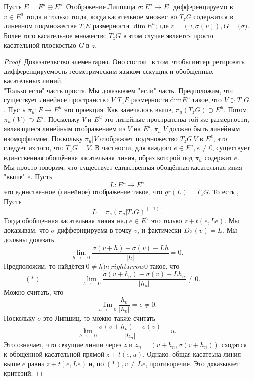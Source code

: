 \begin{criteria}
Пусть $E=E^u \oplus E^s$. Отображение Липшица $\sigma : E^u \rightarrow E^s$ дифференцируемо в $v \in E^u$ тогда и только тогда, когда касательное множество $T_zG$ содержится в линейном подмножестве $T_zE$ размерности $\dim E^u$; где $z=(v,\sigma(v)), G=\mathrm(\sigma)$. Более того касательное множество $T_zG$ в этом случае является просто касательной плоскостью $G$ в $z$.
\end{criteria}
\begin{proof}
Доказательство элементарно. Оно состоит в том, чтобы интерпретировать дифференцируемость геометрическим языком секущих и обобщенных касательных линий. \\ "Только если" часть проста. Мы доказываем "если" часть. Предположим, что существует линейное пространство $V$ $T_zE$ размерности $\mathrm{dim} E^u$ такое, что $V \supset T_zG$. Пусть $\pi_u : E \rightarrow E^u$ это проекция. Как замечалось выше, $\pi_u (T_zG) \supset E^u$. Потом $\pi_u (V) \supset E^u$. Поскольку $V$ и $E^u$ это линейные пространства той же размерности, являющиеся линейным отображением из $V$ на $E^u, \pi_u | V$ должно быть линейным изоморфизмом. Поскольку $\pi_u | V$ отображает подмножество $T_zG \ V$ в $E^u$, это следует из того, что $T_zG = V$. В частности, для каждого $e \in E^u, e \neq 0$, существует единственная обощённая касательная линия, образ которой под $\pi_u$ содержит $e$. Мы просто говорим, что существует единственная обощённая касательная иния "выше" $e$. Пусть
$$
L: E^u \rightarrow E^s
$$
это единственное (линейное) отображение такое, что $gr(L) = T_zG$. То есть , Пусть
$$
L = \pi_s(\pi_u|T_zG)^(-1).
$$
Тогда обобщенная касательная линия над $e \in E^u$ это только $z + t(e,Le).$
Мы доказывам, что $\sigma$ диффернцируема в точку $v$, и фактически $D\sigma(v) = L.$ Мы должны доказать
$$
\lim\limits_{h \to + \ 0} {\frac{\sigma(v + h) - \sigma(v) - Lh}{|h|} = 0.}
$$
Предположим, то найдётся $0 \neq h)n \ rightarrow 0$  такое, что 
$$
(\ast) \ \ \ \ \ \ \ \ \ \  \ \ \ \ \ \ \ \ \ \ \ \ \ \ \ \ \
\lim\limits_{h \to + \ 0} {\frac{\sigma(v + h_n) - \sigma(v) - Lh_n}{|h_n|} \neq 0.} \ \ \ \ \ \ \ \ \ \ \ \ \ \ \ \ \ \ \
$$
Можно считать, что 
$$
\lim\limits_{h \to + \ 0} {\frac{h_n}{|h_n|} = e \neq 0.}
$$
Поскольку $\sigma$ это Липшиц, то можно также считать
$$
\lim\limits_{h \to + \ 0} {\frac{\sigma(v + h_n) - \sigma(v)}{|h_n|} = u.}
$$
Это означает, что секущие линии через $z$ и $z_n = (v + h_n, \sigma(v + h_n))$ сходятся к обощённой касательной прямой $z + t(e,u).$ Однако, общая касатеьна линия выше $e$ равна $z + t(e,L e)$ и, по $(\ast), u \neq Le$, противоречие. Это доказывает критерий.
\end{proof}

